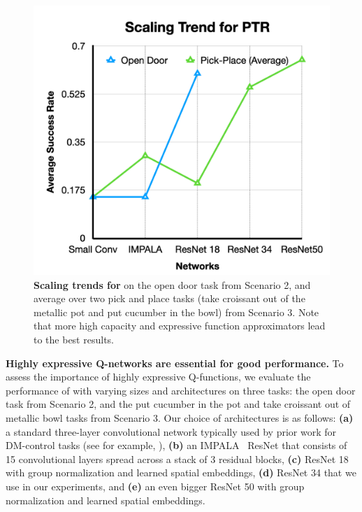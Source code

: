 \documentclass[conference]{IEEEtran}
\begin{document}
\begin{figure}
\includegraphics[width=0.9\linewidth]{scaling_ptr.pdf}
\caption{\footnotesize{\label{fig:scaling_ptr2} \textbf{Scaling trends for \methodname} on the open door task from Scenario 2, and average over two pick and place tasks (take croissant out of the metallic pot and put cucumber in the bowl) from Scenario 3. Note that more high capacity and expressive function approximators lead to the best results.}}
\end{figure}

\textbf{Highly expressive Q-networks are essential for good performance.} To assess the importance of highly expressive Q-functions, we evaluate the performance of \methodname with varying sizes and architectures on three tasks: the open door task from Scenario 2, and the put cucumber in the pot and take croissant out of metallic bowl tasks from Scenario 3. Our choice of architectures is as follows: \textbf{(a)} a standard three-layer convolutional network typically used by prior work for DM-control tasks (see for example, \citet{kostrikov2021offline}), \textbf{(b)} an IMPALA~\citep{espeholt2018impala} ResNet that consists of 15 convolutional layers spread across a stack of 3 residual blocks, \textbf{(c)} ResNet 18 with group normalization and learned spatial embeddings, \textbf{(d)} ResNet 34 that we use in our experiments, and \textbf{(e)} an even bigger ResNet 50 with group normalization and learned spatial embeddings. 
\end{document}
